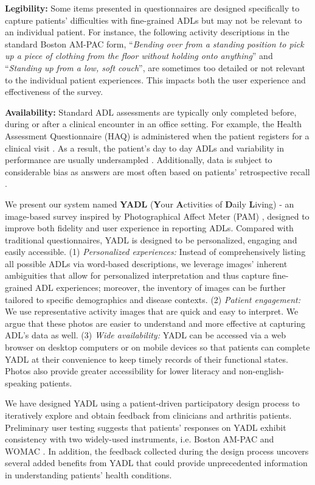 \documentclass{sig-alternate-05-2015}
\begin{document}
\textbf{Legibility:} Some items presented in questionnaires are designed specifically to capture patients' difficulties with fine-grained ADLs but may not be relevant to an individual patient. For instance, the following activity descriptions in the standard Boston AM-PAC form, ``\textit{Bending over from a standing position to pick up a piece of clothing from the floor without holding onto anything}'' and ``\textit{Standing up from a low, soft couch}'', are sometimes too detailed or not relevant to the individual patient experiences. This impacts both the  user experience and effectiveness of the survey.

\textbf{Availability:} Standard ADL assessments are typically only completed before, during or after a clinical encounter in an office setting. For example, the Health Assessment Questionnaire (HAQ) \cite{bruce2003stanford} is administered when the patient registers for a clinical visit \cite{pincus2004quantitative}. As a result, the patient's day to day ADLs and variability in performance are usually undersampled \cite{mancuso1995does}. Additionally, data is subject to considerable bias as answers are most often based on patients' retrospective recall \cite{stone2002capturing}.

We present our system named \textbf{YADL} (\textbf{Y}our \textbf{A}ctivities of \textbf{D}aily \textbf{L}iving) - an image-based survey inspired by Photographical Affect Meter (PAM) \cite{pollak2011pam}, designed to improve both fidelity and user experience in reporting ADLs. Compared with traditional questionnaires, YADL is designed to be personalized, engaging and easily accessible. (1) \textit{Personalized experiences:} Instead of comprehensively listing all possible ADLs via word-based descriptions, we leverage images' inherent ambiguities that allow for personalized interpretation and thus capture fine-grained ADL experiences; moreover, the inventory of images can be further tailored to specific demographics and disease contexts. (2) \textit{Patient engagement:} We use representative activity images that are quick and easy to interpret. We argue that these photos are easier to understand and more effective at capturing ADL's data as well. (3) \textit{Wide availability:} YADL can be accessed via a web browser on desktop computers or on mobile devices so that patients can complete YADL at their convenience to keep timely records of their functional states. Photos also provide greater accessibility for lower literacy and non-english-speaking patients.

We have designed YADL using a patient-driven participatory design process to iteratively explore and obtain feedback from clinicians and arthritis patients. Preliminary user testing suggests that patients' responses on YADL exhibit consistency with two widely-used instruments, i.e. Boston AM-PAC \cite{haley2004short} and WOMAC \cite{mcconnell2001western}. In addition, the feedback collected during the design process uncovers several added benefits from YADL that could provide unprecedented information in understanding patients' health conditions. 
\end{document}
